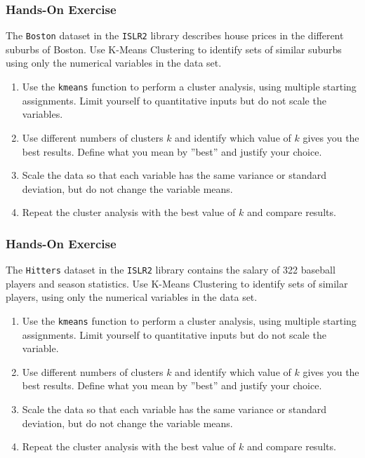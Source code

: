 \begin{tcolorbox}[colback=code]
\subsubsection*{Hands-On Exercise} 
The \texttt{Boston} dataset in the \texttt{ISLR2} library describes house prices in the different suburbs of Boston. Use K-Means Clustering to identify sets of similar suburbs using only the numerical variables in the data set.
\begin{enumerate}
   \item Use the \texttt{kmeans} function to perform a cluster analysis, using multiple starting assignments. Limit yourself to quantitative inputs but do not scale the variables.
   \item Use different numbers of clusters $k$ and identify which value of $k$ gives you the best results. Define what you mean by ''best'' and justify your choice.
   \item Scale the data so that each variable has the same variance or standard deviation, but do not change the variable means. 
   \item Repeat the cluster analysis with the best value of $k$ and compare results.\end{enumerate}
\end{tcolorbox}

\begin{tcolorbox}[colback=code]
\subsubsection*{Hands-On Exercise} 
The \texttt{Hitters} dataset in the \texttt{ISLR2} library contains the salary of 322 baseball players and season statistics. Use K-Means Clustering to identify sets of similar players, using only the numerical variables in the data set.

\begin{enumerate}
   \item Use the \texttt{kmeans} function to perform a cluster analysis, using multiple starting assignments. Limit yourself to quantitative inputs but do not scale the variable.
   \item Use different numbers of clusters $k$ and identify which value of $k$ gives you the best results. Define what you mean by ''best'' and justify your choice.
   \item Scale the data so that each variable has the same variance or standard deviation, but do not change the variable means. 
   \item Repeat the cluster analysis with the best value of $k$ and compare results.
\end{enumerate}
\end{tcolorbox}

